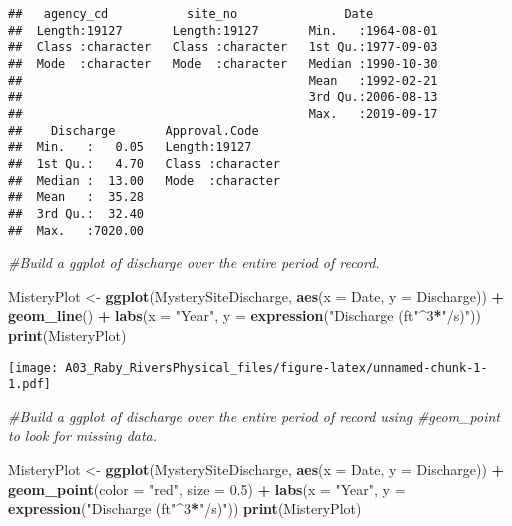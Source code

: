 \documentclass[]{article}
\newenvironment{Shaded}{\begin{snugshade}}{\end{snugshade}}
\newcommand{\CommentTok}[1]{\textcolor[rgb]{0.56,0.35,0.01}{\textit{#1}}}
\newcommand{\DataTypeTok}[1]{\textcolor[rgb]{0.13,0.29,0.53}{#1}}
\newcommand{\DecValTok}[1]{\textcolor[rgb]{0.00,0.00,0.81}{#1}}
\newcommand{\FloatTok}[1]{\textcolor[rgb]{0.00,0.00,0.81}{#1}}
\newcommand{\KeywordTok}[1]{\textcolor[rgb]{0.13,0.29,0.53}{\textbf{#1}}}
\newcommand{\NormalTok}[1]{#1}
\newcommand{\OperatorTok}[1]{\textcolor[rgb]{0.81,0.36,0.00}{\textbf{#1}}}
\newcommand{\StringTok}[1]{\textcolor[rgb]{0.31,0.60,0.02}{#1}}
\begin{document}
\begin{verbatim}
##   agency_cd           site_no               Date           
##  Length:19127       Length:19127       Min.   :1964-08-01  
##  Class :character   Class :character   1st Qu.:1977-09-03  
##  Mode  :character   Mode  :character   Median :1990-10-30  
##                                        Mean   :1992-02-21  
##                                        3rd Qu.:2006-08-13  
##                                        Max.   :2019-09-17  
##    Discharge       Approval.Code     
##  Min.   :   0.05   Length:19127      
##  1st Qu.:   4.70   Class :character  
##  Median :  13.00   Mode  :character  
##  Mean   :  35.28                     
##  3rd Qu.:  32.40                     
##  Max.   :7020.00
\end{verbatim}

\begin{Shaded}
\begin{Highlighting}[]
\CommentTok{#Build a ggplot of discharge over the entire period of record.}

\NormalTok{MisteryPlot <-}\StringTok{ }
\StringTok{  }\KeywordTok{ggplot}\NormalTok{(MysterySiteDischarge, }\KeywordTok{aes}\NormalTok{(}\DataTypeTok{x =}\NormalTok{ Date, }\DataTypeTok{y =}\NormalTok{ Discharge)) }\OperatorTok{+}
\StringTok{         }\KeywordTok{geom_line}\NormalTok{() }\OperatorTok{+}
\StringTok{         }\KeywordTok{labs}\NormalTok{(}\DataTypeTok{x =} \StringTok{"Year"}\NormalTok{, }\DataTypeTok{y =} \KeywordTok{expression}\NormalTok{(}\StringTok{"Discharge (ft"}\OperatorTok{^}\DecValTok{3}\OperatorTok{*}\StringTok{"/s)"}\NormalTok{))}
  \KeywordTok{print}\NormalTok{(MisteryPlot)}
\end{Highlighting}
\end{Shaded}

\texttt{[image: A03\_Raby\_RiversPhysical\_files/figure-latex/unnamed-chunk-1-1.pdf]}

\begin{Shaded}
\begin{Highlighting}[]
\CommentTok{#Build a ggplot of discharge over the entire period of record using}
\CommentTok{#geom_point to look for missing data.}

\NormalTok{MisteryPlot <-}\StringTok{ }
\StringTok{  }\KeywordTok{ggplot}\NormalTok{(MysterySiteDischarge, }\KeywordTok{aes}\NormalTok{(}\DataTypeTok{x =}\NormalTok{ Date, }\DataTypeTok{y =}\NormalTok{ Discharge)) }\OperatorTok{+}
\StringTok{         }\KeywordTok{geom_point}\NormalTok{(}\DataTypeTok{color =} \StringTok{"red"}\NormalTok{, }\DataTypeTok{size =} \FloatTok{0.5}\NormalTok{) }\OperatorTok{+}
\StringTok{         }\KeywordTok{labs}\NormalTok{(}\DataTypeTok{x =} \StringTok{"Year"}\NormalTok{, }\DataTypeTok{y =} \KeywordTok{expression}\NormalTok{(}\StringTok{"Discharge (ft"}\OperatorTok{^}\DecValTok{3}\OperatorTok{*}\StringTok{"/s)"}\NormalTok{))}
\KeywordTok{print}\NormalTok{(MisteryPlot)}
\end{Highlighting}
\end{Shaded}
\end{document}
